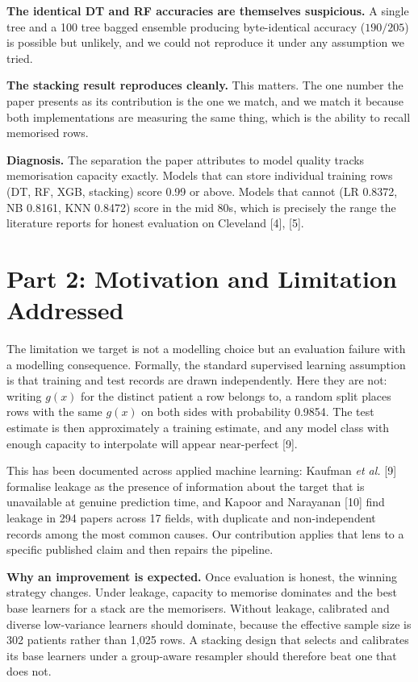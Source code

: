 \documentclass[11pt,a4paper]{article}
\newenvironment{keypoint}{\begin{leftbar}\small}{\end{leftbar}}
\begin{document}
\textbf{The identical DT and RF accuracies are themselves suspicious.} A single
tree and a 100 tree bagged ensemble producing byte-identical accuracy
($190/205$) is possible but unlikely, and we could not reproduce it under any
assumption we tried.

\textbf{The stacking result reproduces cleanly.} This matters. The one number the
paper presents as its contribution is the one we match, and we match it because
both implementations are measuring the same thing, which is the ability to recall
memorised rows.

\begin{keypoint}
\textbf{Diagnosis.} The separation the paper attributes to model quality tracks
memorisation capacity exactly. Models that can store individual training rows
(DT, RF, XGB, stacking) score 0.99 or above. Models that cannot (LR 0.8372,
NB 0.8161, KNN 0.8472) score in the mid 80s, which is precisely the range the
literature reports for honest evaluation on Cleveland
[4], [5].
\end{keypoint}

\section{Part 2: Motivation and Limitation Addressed}\label{sec:motivation}

The limitation we target is not a modelling choice but an evaluation failure
with a modelling consequence. Formally, the standard supervised learning
assumption is that training and test records are drawn independently. Here they
are not: writing $g(x)$ for the distinct patient a row belongs to, a random split
places rows with the same $g(x)$ on both sides with probability 0.9854. The test
estimate is then approximately a training estimate, and any model class with
enough capacity to interpolate will appear near-perfect [9].

This has been documented across applied machine learning: Kaufman \emph{et al.}
[9] formalise leakage as the presence of information about the
target that is unavailable at genuine prediction time, and Kapoor and Narayanan
[10] find leakage in 294 papers across 17 fields, with duplicate and
non-independent records among the most common causes. Our contribution applies
that lens to a specific published claim and then repairs the pipeline.

\begin{keypoint}
\textbf{Why an improvement is expected.} Once evaluation is honest, the winning
strategy changes. Under leakage, capacity to memorise dominates and the best base
learners for a stack are the memorisers. Without leakage, calibrated and diverse
low-variance learners should dominate, because the effective sample size is 302
patients rather than 1{,}025 rows. A stacking design that selects and calibrates
its base learners under a group-aware resampler should therefore beat one that
does not.
\end{keypoint}
\end{document}
